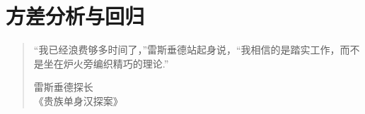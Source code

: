 \section{方差分析与回归}\label{sec:11}
\begin{quote}
“我已经浪费够多时间了，”雷斯垂德站起身说，“我相信的是踏实工作，而不是坐在炉火旁编织精巧的理论.”
\begin{flushright}
雷斯垂德探长\\《贵族单身汉探案》
\end{flushright}
\end{quote}






